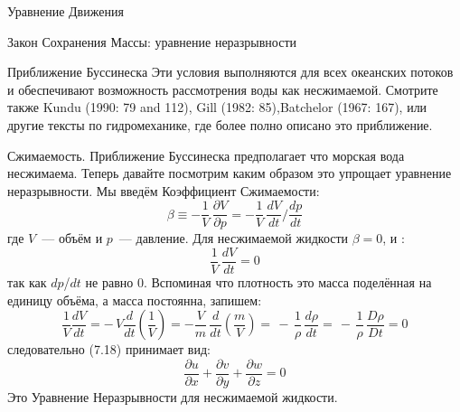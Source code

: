 \begin{chapter}{Уравнение Движения}
\begin{section}{Закон Сохранения Массы: уравнение неразрывности}
\begin{paragraph}{Приближение Буссинеска}
Эти условия выполняются для всех океанских потоков и обеспечивают
возможность рассмотрения воды как несжимаемой. Смотрите также Kundu
(1990: 79 and 112), Gill (1982: 85),Batchelor (1967: 167), или другие
тексты по гидромеханике, где более полно описано это приближение.
%
\end{paragraph}

\begin{paragraph}{Сжимаемость.}
Приближение Буссинеска предполагает что морская вода
несжимаема. Теперь давайте посмотрим каким образом это упрощает
уравнение неразрывности. Мы введём Коэффициент Сжимаемости:
\begin{displaymath}
\beta \equiv -\frac{1}{V}\,\frac{\partial{V}}{\partial{p}} =
-\frac{1}{V}\,\frac{dV}{dt}\Big/\frac{dp}{dt}
\end{displaymath}
где $V$~--- объём и $p$~--- давление. Для несжимаемой жидкости
$\beta = 0$, и :
\begin{displaymath}
\frac{1}{V}\,\frac{dV}{dt} = 0
\end{displaymath}
так как $dp$/$dt$ не равно 0. Вспоминая что плотность это масса
поделённая на единицу объёма, а масса постоянна, запишем:
\begin{displaymath}
\frac{1}{V}\frac{dV}{dt} = -\,V\frac{d}{dt}\left(\frac{1}{V}\right) =
- \frac{V}{m}\,\frac{d}{dt}\left(\frac{m}{V}\right)
=\,-\,\frac{1}{\rho}\,\frac{d\rho}{dt} =\,-\,\frac{1}{\rho}\, \frac{D\rho}{Dt} = 0
\end{displaymath}
следовательно (7.18) принимает вид:
\begin{equation}
\boxed{
 \frac{\partial{u}}{\partial{x}} + \frac{\partial{v}}{\partial{y}} + \frac{\partial{w}}{\partial{z}} = 0
}
\end{equation}
Это Уравнение Неразрывности для несжимаемой жидкости.
%

\end{paragraph}
\end{section}
\end{chapter}
